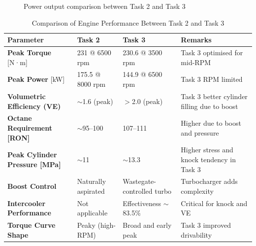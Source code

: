 \begin{figure}[H]
  \centering
  \caption{Power output comparison between Task 2 and Task 3}
  \label{fig:task3_power_comparison}
\end{figure}


\begin{table}[h!]
\centering
\caption{Comparison of Engine Performance Between Task 2 and Task 3}
\small
\begin{tabular}{|p{4.5cm}|p{3.5cm}|p{3.5cm}|p{3.5cm}|}
\hline
\textbf{Parameter} & \textbf{Task 2} & \textbf{Task 3} & \textbf{Remarks} \\
\hline
\textbf{Peak Torque} [N·m] & 231 @ 6500 rpm & 230.6 @ 3500 rpm & Task 3 optimised for mid-RPM \\
\hline
\textbf{Peak Power} [kW] & 175.5 @ 8000 rpm & 144.9 @ 6500 rpm & Task 3 RPM limited \\
\hline
\textbf{Volumetric Efficiency (VE)} & $\sim$1.6 (peak) & $>$2.0 (peak) & Task 3 better cylinder filling due to boost \\
\hline
\textbf{Octane Requirement [RON]} & $\sim$95–100 & 107–111 & Higher due to boost and pressure \\
\hline
\textbf{Peak Cylinder Pressure [MPa]} & $\sim$11 & $\sim$13.3 & Higher stress and knock tendency in Task 3 \\
\hline
\textbf{Boost Control} & Naturally aspirated & Wastegate-controlled turbo & Turbocharger adds complexity \\
\hline
\textbf{Intercooler Performance} & Not applicable & Effectiveness $\sim$83.5\% & Critical for knock and VE \\
\hline
\textbf{Torque Curve Shape} & Peaky (high-RPM) & Broad and early peak & Task 3 improved drivability \\
\hline
\end{tabular}
\end{table}

